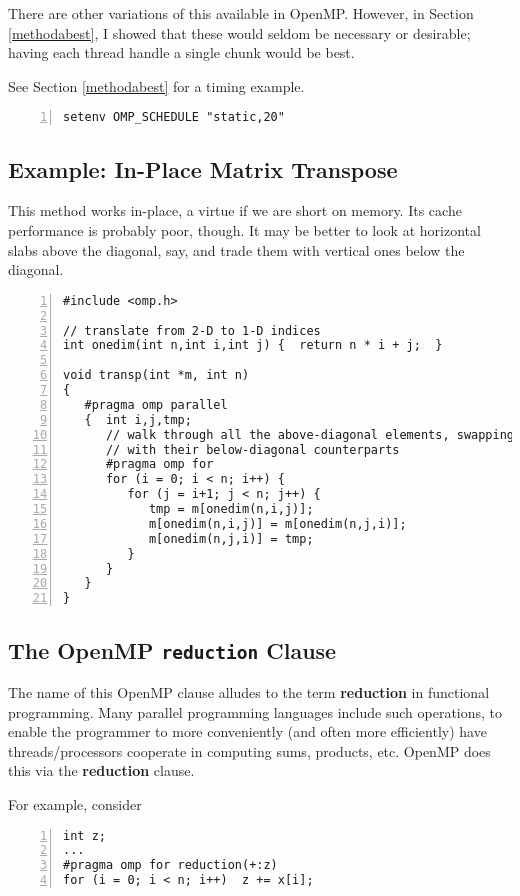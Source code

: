 There are other variations of this available in OpenMP.  However, in
Section \ref{methodabest}, I showed that these would seldom be
necessary or desirable; having each thread handle a single chunk would
be best.

See Section \ref{methodabest} for a timing example.

\begin{lstlisting}[numbers=left]
setenv OMP_SCHEDULE "static,20"
\end{lstlisting}

\subsection{Example:  In-Place Matrix Transpose}

This method works in-place, a virtue if we are short on memory.  Its
cache performance is probably poor, though.  It may be better to look at
horizontal slabs above the diagonal, say, and trade them with vertical
ones below the diagonal.

\begin{lstlisting}[numbers=left]
#include <omp.h>

// translate from 2-D to 1-D indices
int onedim(int n,int i,int j) {  return n * i + j;  }

void transp(int *m, int n)
{
   #pragma omp parallel
   {  int i,j,tmp;
      // walk through all the above-diagonal elements, swapping them
      // with their below-diagonal counterparts
      #pragma omp for
      for (i = 0; i < n; i++) {
         for (j = i+1; j < n; j++) {
            tmp = m[onedim(n,i,j)];
            m[onedim(n,i,j)] = m[onedim(n,j,i)];
            m[onedim(n,j,i)] = tmp;
         }
      }
   }
}
\end{lstlisting}

\subsection{The OpenMP {\tt reduction} Clause}
\label{ompreduction}

The name of this OpenMP clause alludes to the term {\bf reduction} in
functional programming.  Many parallel programming languages include
such operations, to enable the programmer to more conveniently (and
often more efficiently) have threads/processors cooperate in computing
sums, products, etc.  OpenMP does this via the {\bf reduction} clause.

For example, consider

\begin{Verbatim}[fontsize=\relsize{-2},numbers=left]
int z;
...
#pragma omp for reduction(+:z)
for (i = 0; i < n; i++)  z += x[i];
\end{Verbatim}

